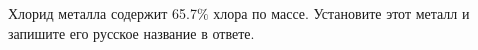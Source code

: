 
Хлорид металла содержит 65.7$\%$ хлора по массе. Установите этот металл и запишите его русское название в 
ответе.



